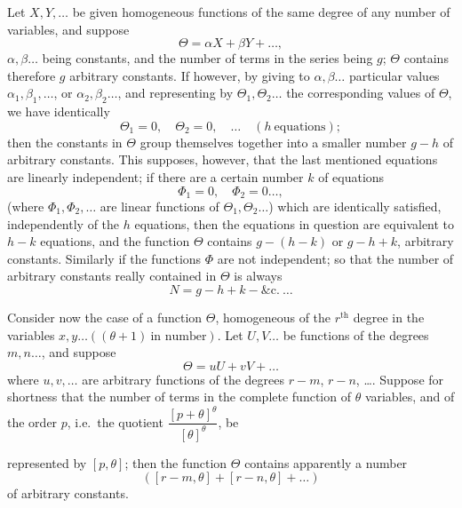 \documentclass[11pt]{article}
\begin{document}
Let $X, Y, \ldots$ be given homogeneous functions of the same degree of any number of variables, and suppose
\[
\Theta = \alpha X + \beta Y + \ldots,
\]
$\alpha, \beta \ldots$ being constants, and the number of terms in the series being $g$; $\Theta$ contains therefore $g$ arbitrary constants. If however, by giving to $\alpha, \beta \ldots$ particular values $\alpha_1, \beta_1, \ldots$, or $\alpha_2, \beta_2 \ldots$, and representing by $\Theta_1, \Theta_2 \ldots$ the corresponding values of $\Theta$, we have identically
\[
\Theta_1 = 0,\quad \Theta_2 = 0,\quad \ldots \quad (h\ \text{equations});
\]
then the constants in $\Theta$ group themselves together into a smaller number $g - h$ of arbitrary constants. This supposes, however, that the last mentioned equations are linearly independent; if there are a certain number $k$ of equations
\[
\Phi_1 = 0,\quad \Phi_2 = 0 \ldots,
\]
(where $\Phi_1, \Phi_2, \ldots$ are linear functions of $\Theta_1, \Theta_2 \ldots$) which are identically satisfied, independently of the $h$ equations, then the equations in question are equivalent to $h - k$ equations, and the function $\Theta$ contains $g - (h - k)$ or $g - h + k$, arbitrary constants. Similarly if the functions $\Phi$ are not independent; so that the number of arbitrary constants really contained in $\Theta$ is always
\[
N = g - h + k - \&\mathrm{c}.\ \ldots
\]

Consider now the case of a function $\Theta$, homogeneous of the $r^{\mathrm{th}}$ degree in the variables $x, y \ldots ((\theta + 1)\ \text{in number})$. Let $U, V \ldots$ be functions of the degrees $m, n \ldots$, and suppose
\[
\Theta = uU + vV + \ldots
\]
where $u, v, \ldots$ are arbitrary functions of the degrees $r - m$, $r - n$, \ldots. Suppose for shortness that the number of terms in the complete function of $\theta$ variables, and of the order $p$, i.e.\ the quotient $\dfrac{[p+\theta]^\theta}{[\theta]^\theta}$, be

\newpage
\setcounter{page}{261}

represented by $[p, \theta]$; then the function $\Theta$ contains apparently a number
\[
([r - m, \theta] + [r - n, \theta] + \ldots)
\]
of arbitrary constants.
\end{document}
